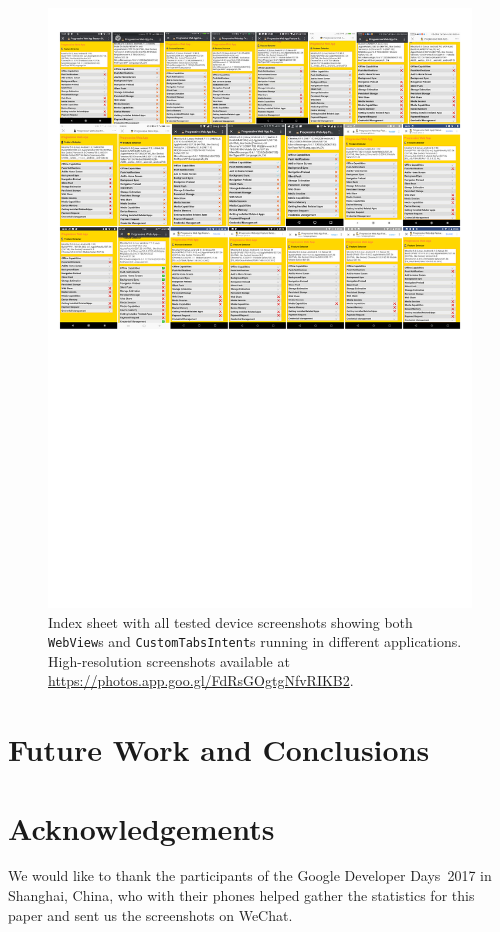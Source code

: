 \documentclass[sigconf]{acmart}
\begin{document}
\begin{figure}[htb]
  \begin{center}
  \centerline{\includegraphics[trim=.5cm 13.75cm .5cm .5cm, clip]{index-sheet.pdf}}
  \caption{Index sheet with all tested device screenshots showing both \texttt{WebView}s
    and \texttt{CustomTabsIntent}s running in different applications.
    High-resolution screenshots available at \url{https://photos.app.goo.gl/FdRsGOgtgNfvRIKB2}.}
  \label{fig:indexsheet}
  \end{center}
\end{figure}

\section{Future Work and Conclusions}
\label{sec:future-work-conclusions}

\section*{Acknowledgements}

We would like to thank the participants of the Google Developer Days~2017 in Shanghai, China,
who with their phones helped gather the statistics for this paper and sent us
the screenshots on WeChat.



\end{document}
